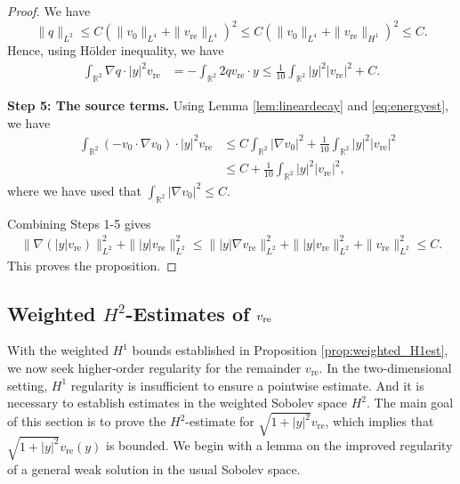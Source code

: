 \documentclass[12pt]{amsart}
\numberwithin{equation}{section}              %
\theoremstyle{remark}
\begin{document}
\begin{proof}
			We have
			\begin{equation*}
				\| q\|_{L^{2}}\leq C	  \left(\|v_0 \|_{L^{4}} + \|v_{\text{re}}\|_{L^{4}}
				\right)^2 \leq C	  \left(\|v_0 \|_{L^{4}} + \|v_{\text{re}}\|_{H^{1}}
				\right)^2  \leq C.
			\end{equation*}
			Hence, using H\"older inequality, we have
			\begin{equation*}
				\begin{aligned}
					\int_{\mathbb{R}^2} \nabla q \cdot |y|^2 v_{\text{re}}& = 	-\int_{\mathbb{R}^2} 2q v_{\text{re}}\cdot y\leq \frac{1}{10}\int_{\mathbb{R}^2} |y|^2|v_{\text{re}}|^2 + C.
				\end{aligned}
			\end{equation*}
			
			\textbf{Step 5: The source terms.}
            Using Lemma \ref{lem:lineardecay} and \eqref{eq:energyest},
            we have
			\begin{equation*}
				\begin{aligned}
					\quad \int_{\mathbb{R}^2} (-v_0\cdot \nabla v_0 ) \cdot |y|^2 v_{\text{re}}
					& \leq C \int_{\mathbb{R}^2} |\nabla v_0|^2 
					+ \frac{1}{10} \int_{\mathbb{R}^2}  |y|^2|v_{\text{re}}|^2 \\
					& \leq C+  \frac{1}{10} \int_{\mathbb{R}^2}  |y|^2|v_{\text{re}}|^2,
				\end{aligned}
			\end{equation*}
			where we have used that $\int_{\mathbb{R}^2} |\nabla v_0|^2  \leq C$.
			
			
			Combining Steps 1-5 gives
			\begin{equation*}
				\begin{aligned}
				\|\nabla(|y|  v_{\text{re}})\|_{L^2}^2 +  \| |y| v_{\text{re}} \|_{L^2}^2\leq 	\||y| \nabla v_{\text{re}}\|_{L^2}^2 +  \| |y| v_{\text{re}} \|_{L^2}^2 + \| v_{\text{re}} \|_{L^2}^2 \leq C.
				\end{aligned}
			\end{equation*}
			This proves the proposition.
		\end{proof}
		
		\subsection{Weighted $H^2$-Estimates of $v_{\textnormal{re}}$}
		With the weighted $H^1$ bounds established in Proposition \ref{prop:weighted_H1est}, we now seek higher-order regularity for the remainder $v_{\text{re}}$. In the two-dimensional setting, $H^1$ regularity is insufficient to ensure a pointwise estimate. And it is necessary to establish estimates in the weighted Sobolev space $H^2$. The main goal of this section is to prove the $H^2$-estimate for $\sqrt{1+|y|^2}v_{\text{re}}$, which implies that $\sqrt{1+|y|^2}v_{\text{re}}(y)$ is bounded.
		We begin with a lemma on  the improved regularity of a general weak solution in the usual Sobolev space.
		
\end{document}

